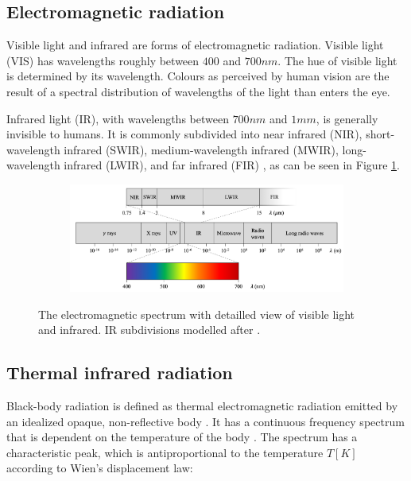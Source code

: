 \documentclass{l4proj}
\begin{document}
\subsection{Electromagnetic radiation}

Visible light and infrared are forms of electromagnetic radiation. Visible light (VIS) has wavelengths roughly between $400$ and $700 nm$. The hue of visible light is determined by its wavelength. Colours as perceived by human vision are the result of a spectral distribution of wavelengths of the light than enters the eye. 

Infrared light (IR), with wavelengths between $700 nm$ and $1 mm$, is generally invisible to humans. It is commonly subdivided into near infrared (NIR), short-wavelength infrared (SWIR), medium-wavelength infrared (MWIR), long-wavelength infrared (LWIR), and far infrared (FIR) \citep[p. 28]{byrnes_unexploded_2008}, as can be seen in Figure \ref{fig:em_spectrum}.

\begin{figure}[h]
  \centering
  \begin{subfigure}[h!]{0.9\textwidth}
    \includegraphics[width=\textwidth]{images/EM_spectrum.png}
  \end{subfigure}
  \caption{The electromagnetic spectrum with detailled view of visible light and infrared. IR subdivisions modelled after \citet[p. 28]{byrnes_unexploded_2008}.}
  \label{fig:em_spectrum}
\end{figure}

\subsection{Thermal infrared radiation}

Black-body radiation is defined as thermal electromagnetic radiation emitted by an idealized opaque, non-reflective body \citep{young_sears_2012}. It has a continuous frequency spectrum that is dependent on the temperature of the body \citep{kogure_thermodynamic_2007}. The spectrum has a characteristic peak, which is antiproportional to the temperature $T [K]$ according to Wien's displacement law:
\end{document}
